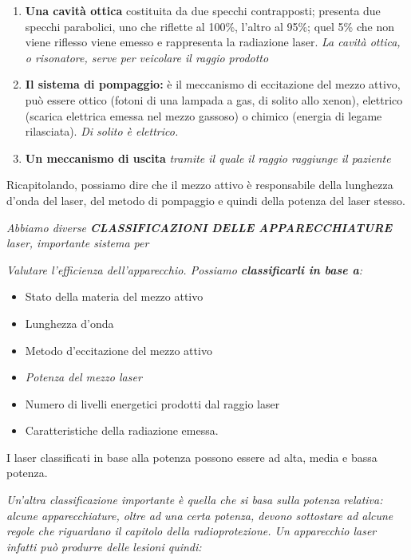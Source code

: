 \documentclass[]{article}
\begin{document}
\begin{enumerate}
\def\labelenumi{\arabic{enumi})}
\item
  \textbf{Una cavità ottica} costituita da due specchi contrapposti;
  presenta due specchi parabolici, uno che riflette al 100\%, l'altro al
  95\%; quel 5\% che non viene riflesso viene emesso e rappresenta la
  radiazione laser. \emph{La cavità ottica, o risonatore, serve per
  veicolare il raggio prodotto}
\item
  \textbf{Il sistema di pompaggio:} è il meccanismo di eccitazione del
  mezzo attivo, può essere ottico (fotoni di una lampada a gas, di
  solito allo xenon), elettrico (scarica elettrica emessa nel mezzo
  gassoso) o chimico (energia di legame rilasciata). \emph{Di solito è
  elettrico.}
\item
  \textbf{Un meccanismo di uscita} \emph{tramite il quale il raggio
  raggiunge il paziente }
\end{enumerate}

Ricapitolando, possiamo dire che il mezzo attivo è responsabile della
lunghezza d'onda del laser, del metodo di pompaggio e quindi della
potenza del laser stesso.

\emph{Abbiamo diverse \textbf{CLASSIFICAZIONI DELLE APPARECCHIATURE}
laser, importante sistema per}

\emph{Valutare l'efficienza dell'apparecchio. Possiamo
\textbf{classificarli in base a}:}

\begin{itemize}
\item
  Stato della materia del mezzo attivo
\item
  Lunghezza d'onda
\item
  Metodo d'eccitazione del mezzo attivo
\item
  \emph{Potenza del mezzo laser}
\item
  Numero di livelli energetici prodotti dal raggio laser
\item
  Caratteristiche della radiazione emessa.
\end{itemize}

I laser classificati in base alla potenza possono essere ad alta, media
e bassa potenza.

\emph{Un'altra classificazione importante è quella che si basa sulla
\emph{potenza relativa}: alcune apparecchiature, oltre ad una certa
potenza, devono sottostare ad alcune regole che riguardano il capitolo
della radioprotezione. Un apparecchio laser infatti può produrre delle
lesioni quindi:}
\end{document}
